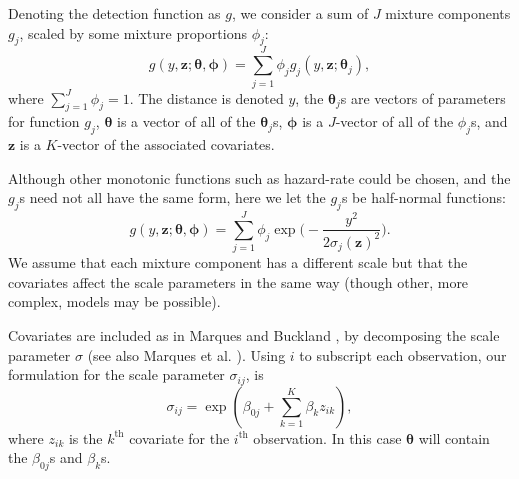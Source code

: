 \documentclass[10pt]{article}
\begin{document}
Denoting the detection function as $g$, we consider a sum of $J$ mixture components $g_j$, scaled by some mixture proportions $\phi_j$:
\begin{equation*}
g(y,\mathbf{z}; \mathbf{\theta}, \mathbf{\phi}) = \sum_{j=1}^J \phi_j g_j(y,\mathbf{z}; \mathbf{\theta}_j),
\end{equation*}
where $\sum_{j=1}^J \phi_j = 1$. The distance is denoted $y$, the $\mathbf{\theta}_j$s are vectors of parameters for function $g_j$, $\mathbf{\theta}$ is a vector of all of the $\mathbf{\theta}_j$s, $\mathbf{\phi}$ is a $J$-vector of all of the $\phi_j$s, and $\mathbf{z}$ is a $K$-vector of the associated covariates.  

Although other monotonic functions such as hazard-rate could be chosen, and the $g_j$s need not all have the same form, here we let the $g_j$s be half-normal functions:
\begin{equation*}
g(y,\mathbf{z}; \mathbf{\theta}, \mathbf{\phi}) = \sum_{j=1}^J \phi_j \exp \Big( - \frac{y^2}{2\sigma_j(\mathbf{z})^2} \Big).
\end{equation*}
We assume that each mixture component has a different scale but that the covariates affect the scale parameters in the same way (though other, more complex, models may be possible).

Covariates are included as in Marques and Buckland \cite{Marques:2003vb}, by decomposing the scale parameter $\sigma$ (see also Marques et al. \cite{Marques:2007vm}).  Using $i$ to subscript each observation, our formulation for the scale parameter $\sigma_{ij}$, is
\begin{equation*}
\sigma_{ij} = \exp( \beta_{0j} + \sum_{k=1}^K \beta_k z_{ik}),
\end{equation*}
where $z_{ik}$ is the $k^\text{th}$ covariate for the $i^\text{th}$ observation. In this case $\mathbf{\theta}$ will contain the $\beta_{0j}$s and $\beta_k$s.
\end{document}
